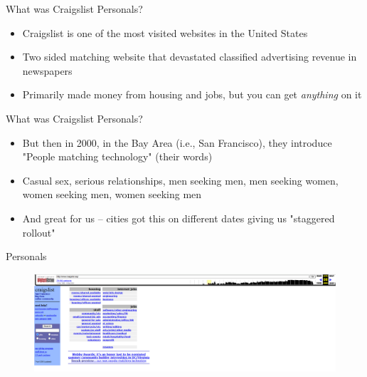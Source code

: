 \documentclass{beamer}
\begin{document}
\begin{frame}{What was Craigslist Personals?}

\begin{itemize}
\item Craigslist is one of the most visited websites in the United States
\item Two sided matching website that devastated classified advertising revenue in newspapers
\item Primarily made money from housing and jobs, but you can get \emph{anything} on it 
\end{itemize}

\end{frame}

\begin{frame}{What was Craigslist Personals?}

\begin{itemize}
\item But then in 2000, in the Bay Area (i.e., San Francisco), they introduce "People matching technology" (their words) 
\item Casual sex, serious relationships, men seeking men, men seeking women, women seeking men, women seeking men
\item And great for us -- cities got this on different dates giving us "staggered rollout" 
\end{itemize}

\end{frame}









\begin{frame}{Personals}

\begin{figure}
    \centering
    \includegraphics[height=0.85\textheight]{./lecture_includes/melanie1}
\end{figure}

\end{frame}
\end{document}
